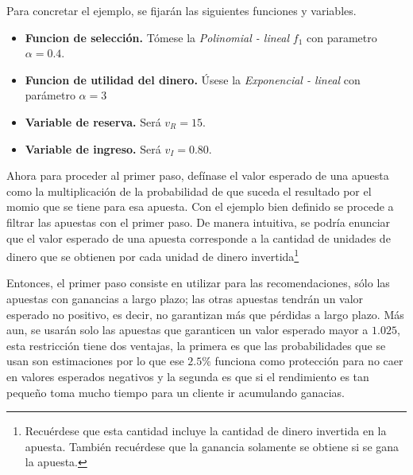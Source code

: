 Para concretar el ejemplo, se fijarán las siguientes funciones y variables.
\begin{itemize}
	\item \textbf{Funcion de selección.} Tómese la \emph{Polinomial - lineal} $f_1$ con parametro $\alpha = 0.4$.
	\item \textbf{Funcion de utilidad del dinero.} Úsese la \emph{Exponencial - lineal} con parámetro $\alpha = 3$
	\item \textbf{Variable de reserva.} Será $v_R = 15$.
	\item \textbf{Variable de ingreso.} Será $v_I = 0.80$.
\end{itemize}
	

Ahora para proceder al primer paso, defínase el valor esperado de una apuesta como la multiplicación de la probabilidad de que suceda el resultado por el momio que se tiene para esa apuesta. 
Con el ejemplo bien definido se procede a filtrar las apuestas con el primer paso. De manera intuitiva, se podría enunciar que el valor esperado de una apuesta corresponde a la cantidad de unidades de dinero que se obtienen por cada unidad de dinero invertida\footnote{Recuérdese que esta cantidad incluye la cantidad de dinero invertida en la apuesta. También recuérdese que la ganancia solamente se obtiene si se gana la apuesta.}

Entonces, el primer paso consiste en utilizar para las recomendaciones, sólo las apuestas con ganancias a largo plazo; las otras apuestas tendrán un valor esperado no positivo, es decir, no garantizan más que pérdidas a largo plazo. Más aun, se usarán solo las apuestas que garanticen un valor esperado mayor a $1.025$, esta restricción tiene dos ventajas, la primera es que las probabilidades que se usan son estimaciones por lo que ese $2.5\%$ funciona como protección para no caer en valores esperados negativos y la segunda es que si el rendimiento es tan pequeño toma mucho tiempo para un cliente ir acumulando ganacias. 

